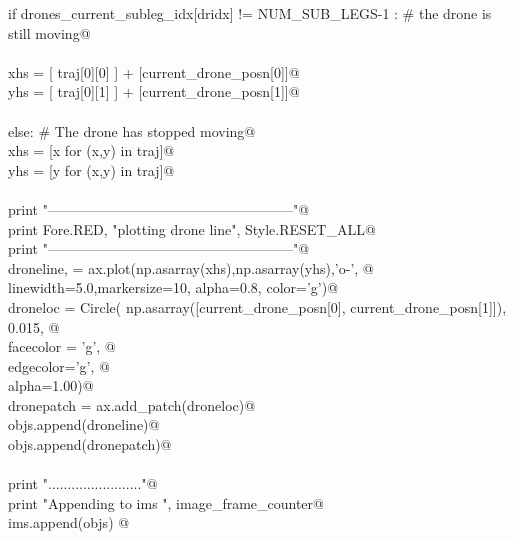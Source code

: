 \documentclass[10.0pt]{report}
\begin{document}
\begin{appendices}
\begin{flushleft}
\begin{list}{}{}
\mbox{}\verb@            if drones_current_subleg_idx[dridx] != NUM_SUB_LEGS-1 : # the drone is still moving@\\
\mbox{}\verb@@\\
\mbox{}\verb@                  xhs = [ traj[0][0] ] + [current_drone_posn[0]]@\\
\mbox{}\verb@                  yhs = [ traj[0][1] ] + [current_drone_posn[1]]@\\
\mbox{}\verb@@\\
\mbox{}\verb@            else: # The drone has stopped moving@\\
\mbox{}\verb@                  xhs = [x for (x,y) in traj]@\\
\mbox{}\verb@                  yhs = [y for (x,y) in traj]@\\
\mbox{}\verb@@\\
\mbox{}\verb@            print "-----------------------------------------------------"@\\
\mbox{}\verb@            print Fore.RED, "plotting drone line", Style.RESET_ALL@\\
\mbox{}\verb@            print "-----------------------------------------------------"@\\
\mbox{}\verb@            droneline, = ax.plot(np.asarray(xhs),np.asarray(yhs),'o-', @\\
\mbox{}\verb@                                   linewidth=5.0,markersize=10, alpha=0.8, color='g')@\\
\mbox{}\verb@            droneloc   = Circle( np.asarray([current_drone_posn[0], current_drone_posn[1]]), 0.015, @\\
\mbox{}\verb@                                    facecolor = 'g', @\\
\mbox{}\verb@                                    edgecolor='g',  @\\
\mbox{}\verb@                                    alpha=1.00)@\\
\mbox{}\verb@            dronepatch = ax.add_patch(droneloc)@\\
\mbox{}\verb@            objs.append(droneline)@\\
\mbox{}\verb@            objs.append(dronepatch)@\\
\mbox{}\verb@@\\
\mbox{}\verb@        print "........................"@\\
\mbox{}\verb@        print "Appending to ims ", image_frame_counter@\\
\mbox{}\verb@        ims.append(objs) @\\

\end{list}
\end{flushleft}
\end{appendices}
\end{document}
